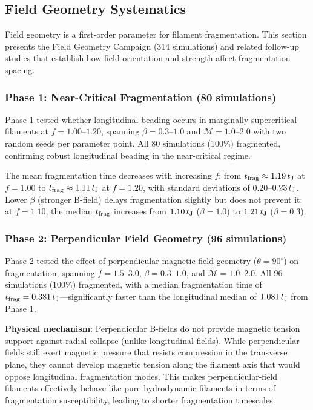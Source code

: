 \documentclass[twocolumn,usenatbib]{mnras}
\begin{document}
\subsection{Field Geometry Systematics}

Field geometry is a first-order parameter for filament fragmentation. This section presents the Field Geometry Campaign (314 simulations) and related follow-up studies that establish how field orientation and strength affect fragmentation spacing.

\subsubsection{Phase 1: Near-Critical Fragmentation (80 simulations)}

Phase 1 tested whether longitudinal beading occurs in marginally supercritical filaments at $f = 1.00$--$1.20$, spanning $\beta = 0.3$--$1.0$ and $\mathcal{M} = 1.0$--$2.0$ with two random seeds per parameter point. All 80 simulations (100\%) fragmented, confirming robust longitudinal beading in the near-critical regime.

The mean fragmentation time decreases with increasing $f$: from $t_{\rm frag} \approx 1.19\,t_{\rm J}$ at $f = 1.00$ to $t_{\rm frag} \approx 1.11\,t_{\rm J}$ at $f = 1.20$, with standard deviations of $0.20$--$0.23\,t_{\rm J}$. Lower $\beta$ (stronger B-field) delays fragmentation slightly but does not prevent it: at $f = 1.10$, the median $t_{\rm frag}$ increases from $1.10\,t_{\rm J}$ ($\beta = 1.0$) to $1.21\,t_{\rm J}$ ($\beta = 0.3$).

\subsubsection{Phase 2: Perpendicular Field Geometry (96 simulations)}

Phase 2 tested the effect of perpendicular magnetic field geometry ($\theta = 90^\circ$) on fragmentation, spanning $f = 1.5$--$3.0$, $\beta = 0.3$--$1.0$, and $\mathcal{M} = 1.0$--$2.0$. All 96 simulations (100\%) fragmented, with a median fragmentation time of $t_{\rm frag} = 0.381\,t_{\rm J}$---significantly faster than the longitudinal median of $1.081\,t_{\rm J}$ from Phase 1.

\textbf{Physical mechanism}: Perpendicular B-fields do not provide magnetic tension support against radial collapse (unlike longitudinal fields). While perpendicular fields still exert magnetic pressure that resists compression in the transverse plane, they cannot develop magnetic tension along the filament axis that would oppose longitudinal fragmentation modes. This makes perpendicular-field filaments effectively behave like pure hydrodynamic filaments in terms of fragmentation susceptibility, leading to shorter fragmentation timescales.
\end{document}
